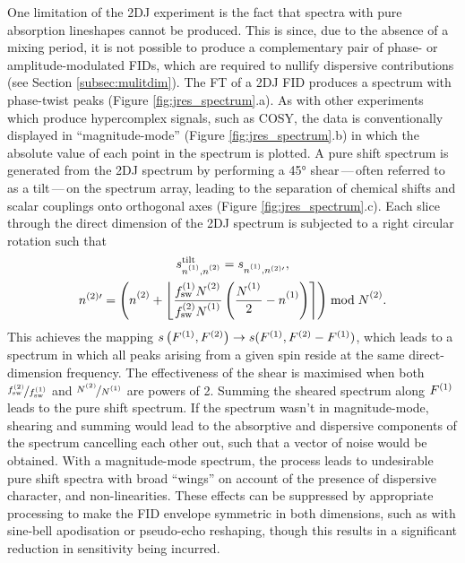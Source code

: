 One limitation of the \ac{2DJ} experiment is the fact that
spectra with pure absorption lineshapes cannot be produced. This is since, due
to the absence of a mixing period, it is not possible to produce a
complementary pair of phase- or amplitude-modulated \acp{FID}, which are
required to nullify dispersive contributions (see Section
\ref{subsec:mulitdim}).
The FT of a \ac{2DJ} \ac{FID} produces a spectrum with phase-twist
peaks (Figure \ref{fig:jres_spectrum}.a). As with other experiments which
produce hypercomplex signals, such as \ac{COSY}, the data is conventionally
displayed in ``magnitude-mode'' (Figure \ref{fig:jres_spectrum}.b) in which the
absolute value of each point in the spectrum is plotted.
A pure shift spectrum is generated from the \ac{2DJ} spectrum by performing a
\ang{45} shear\,---\,often referred to as a tilt\,---\,on the spectrum array,
leading to the separation of chemical shifts and scalar couplings onto
orthogonal axes (Figure \ref{fig:jres_spectrum}.c). Each slice through the
direct dimension of the \ac{2DJ} spectrum is subjected to a right circular
rotation such that
\begin{subequations}
    \begin{gather}
        s_{\none,\ntwo}^{\text{tilt}} =
            s_{\none,n^{(2)\prime}},\\
        n^{(2)\prime} = \left(\ntwo + \left\lfloor
                \frac
                    {\fswone \Ntwo\vpsub{\mathrm{sw}}}
                    {\fswtwo \None\vpsub{\mathrm{sw}}}
                \left(
                    \frac{\None\vpsub{\mathrm{sw}}}{2} - \none
                \right)
            \right\rceil
        \right) \bmod \Ntwo.
    \end{gather}
\end{subequations}
This achieves the mapping $s\left(F^{(1)},F^{(2)}\right) \rightarrow s(F^{(1)}, F^{(2)}
- F^{(1)})$, which leads to a spectrum in which all peaks arising from a
given spin reside at the same direct-dimension frequency. The
effectiveness of the shear is maximised when both $\nicefrac{f_{\mathrm{sw}}^{(2)}}{f_{\mathrm{sw}}^{(1)}}$
and $\nicefrac{\Ntwo}{\None}$ are powers of 2. Summing the
sheared spectrum along $F^{(1)}$ leads to the pure shift spectrum.
If the spectrum wasn't in magnitude-mode, shearing and summing would lead to
the absorptive and dispersive components of the spectrum cancelling each other
out, such that a vector of noise would be obtained.
With a magnitude-mode spectrum, the process leads to undesirable pure shift
spectra with broad ``wings'' on account of the presence of dispersive
character, and non-linearities. These effects can be suppressed by appropriate
processing to make the FID envelope symmetric in both dimensions, such as with
sine-bell apodisation or pseudo-echo reshaping\cite{Bax1981}, though this
results in a significant reduction in sensitivity being incurred.

